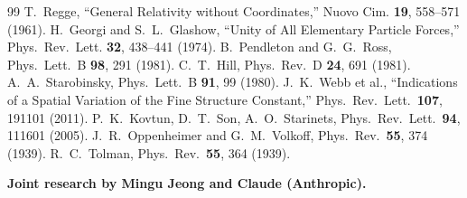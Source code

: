 \documentclass[12pt]{article}
\theoremstyle{remark}
\theoremstyle{definition}
\begin{document}



\begin{thebibliography}{99}
 T.~Regge, ``General Relativity without Coordinates,'' Nuovo Cim. \textbf{19}, 558--571 (1961).
 H.~Georgi and S.~L.~Glashow, ``Unity of All Elementary Particle Forces,'' Phys.~Rev.~Lett. \textbf{32}, 438--441 (1974).
 B.~Pendleton and G.~G.~Ross, Phys.~Lett.~B \textbf{98}, 291 (1981).
 C.~T.~Hill, Phys.~Rev.~D \textbf{24}, 691 (1981).
 A.~A.~Starobinsky, Phys.~Lett.~B \textbf{91}, 99 (1980).
 J.~K.~Webb et al., ``Indications of a Spatial Variation of the Fine Structure Constant,'' Phys.~Rev.~Lett.\ \textbf{107}, 191101 (2011).
 P.~K.~Kovtun, D.~T.~Son, A.~O.~Starinets, Phys.~Rev.~Lett.\ \textbf{94}, 111601 (2005).
 J.~R.~Oppenheimer and G.~M.~Volkoff, Phys.~Rev.\ \textbf{55}, 374 (1939).
 R.~C.~Tolman, Phys.~Rev.\ \textbf{55}, 364 (1939).
\end{thebibliography}

\bigskip
\noindent\textbf{Joint research by Mingu Jeong and Claude (Anthropic).}
\end{document}
